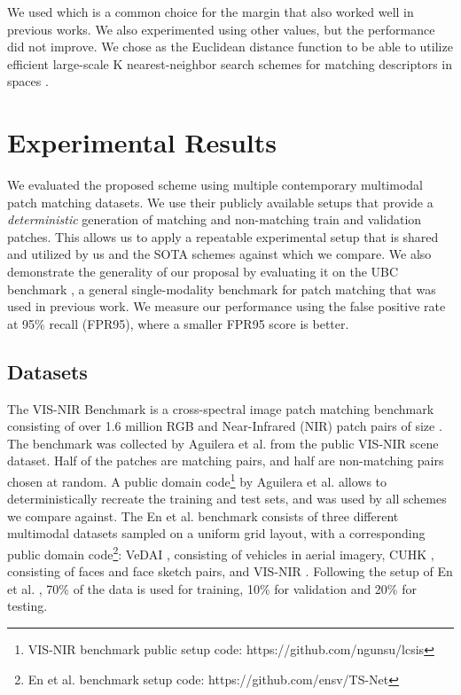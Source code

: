 \documentclass[10pt,journal]{IEEEtran}\usepackage{amsfonts}
\begin{document}
We used  which is a common choice for the margin that also worked well
in previous works. We also experimented using other values, but the
performance did not improve. We chose  as the Euclidean distance function
to be able to utilize efficient large-scale K nearest-neighbor search
schemes for matching descriptors in  spaces \cite{LSH}.

\section{Experimental Results}

\label{sec:experimental}

We evaluated the proposed scheme using multiple contemporary multimodal
patch matching datasets. We use their publicly available setups that provide
a \textit{deterministic }generation of matching and non-matching train and
validation patches. This allows us to apply a repeatable experimental setup
that is shared and utilized by us and the SOTA schemes against which we
compare. We also demonstrate the generality of our proposal by evaluating it
on the UBC benchmark \cite{UBC_benchmark}, a general single-modality
benchmark for patch matching that was used in previous work. We measure our
performance using the false positive rate at 95\% recall (FPR95), where a
smaller FPR95 score is better.

\subsection{Datasets}

The VIS-NIR Benchmark \cite{SiameseCrossSpectral} is a cross-spectral image
patch matching benchmark consisting of over 1.6 million RGB and
Near-Infrared (NIR) patch pairs of size . The benchmark was
collected by Aguilera et al. \cite{SiameseCrossSpectral, Q-net} from the
public VIS-NIR scene dataset. Half of the patches are matching pairs, and
half are non-matching pairs chosen at random. A public domain code\footnote{VIS-NIR benchmark public setup code: https://github.com/ngunsu/lcsis} by
Aguilera et al. allows to deterministically recreate the training and test
sets, and was used by all schemes we compare against. The En et al.
benchmark \cite{TS-net} consists of three different multimodal datasets
sampled on a uniform grid layout, with a corresponding public domain code\footnote{En et al. benchmark setup code: https://github.com/ensv/TS-Net}: VeDAI \cite {Vedai}, consisting of vehicles in aerial imagery, CUHK \cite{CUHK},
consisting of faces and face sketch pairs, and VIS-NIR \cite {SiameseCrossSpectral}. Following the setup of En et al. \cite{TS-net}, 70\%
of the data is used for training, 10\% for validation and 20\% for testing.
\end{document}
